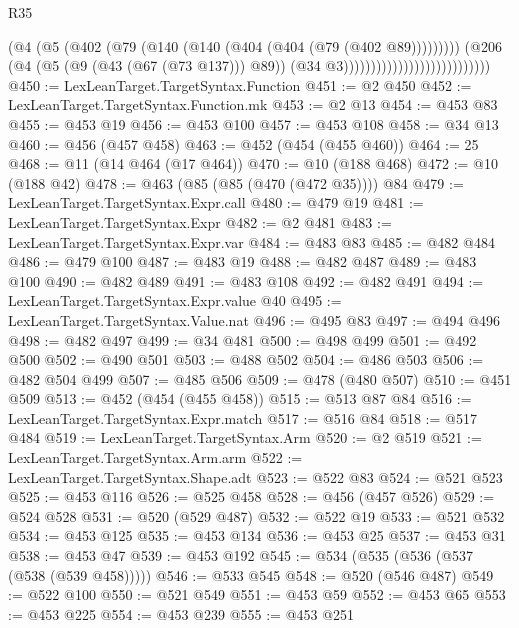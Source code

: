 \begin{lexlean}{R35}
\begin{coremodule}
                                                  (@4
                                                    (@5
                                                      (@402
                                                        (@79
                                                          (@140
                                                            (@140
                                                              (@404 (@404 (@79 (@402 @89)))))))))
                                                    (@206
                                                      (@4
                                                        (@5 (@9 (@43 (@67 (@73 @137))) @89))
                                                        (@34 @3)))))))))))))))))))))))))))
@450 := LexLeanTarget.TargetSyntax.Function
@451 := @2 @450
@452 := LexLeanTarget.TargetSyntax.Function.mk
@453 := @2 @13
@454 := @453 @83
@455 := @453 @19
@456 := @453 @100
@457 := @453 @108
@458 := @34 @13
@460 := @456 (@457 @458)
@463 := @452 (@454 (@455 @460))
@464 := 25
@468 := @11 (@14 @464 (@17 @464))
@470 := @10 (@188 @468)
@472 := @10 (@188 @42)
@478 := @463 (@85 (@85 (@470 (@472 @35)))) @84
@479 := LexLeanTarget.TargetSyntax.Expr.call
@480 := @479 @19
@481 := LexLeanTarget.TargetSyntax.Expr
@482 := @2 @481
@483 := LexLeanTarget.TargetSyntax.Expr.var
@484 := @483 @83
@485 := @482 @484
@486 := @479 @100
@487 := @483 @19
@488 := @482 @487
@489 := @483 @100
@490 := @482 @489
@491 := @483 @108
@492 := @482 @491
@494 := LexLeanTarget.TargetSyntax.Expr.value @40
@495 := LexLeanTarget.TargetSyntax.Value.nat
@496 := @495 @83
@497 := @494 @496
@498 := @482 @497
@499 := @34 @481
@500 := @498 @499
@501 := @492 @500
@502 := @490 @501
@503 := @488 @502
@504 := @486 @503
@506 := @482 @504 @499
@507 := @485 @506
@509 := @478 (@480 @507)
@510 := @451 @509
@513 := @452 (@454 (@455 @458))
@515 := @513 @87 @84
@516 := LexLeanTarget.TargetSyntax.Expr.match
@517 := @516 @84
@518 := @517 @484
@519 := LexLeanTarget.TargetSyntax.Arm
@520 := @2 @519
@521 := LexLeanTarget.TargetSyntax.Arm.arm
@522 := LexLeanTarget.TargetSyntax.Shape.adt
@523 := @522 @83
@524 := @521 @523
@525 := @453 @116
@526 := @525 @458
@528 := @456 (@457 @526)
@529 := @524 @528
@531 := @520 (@529 @487)
@532 := @522 @19
@533 := @521 @532
@534 := @453 @125
@535 := @453 @134
@536 := @453 @25
@537 := @453 @31
@538 := @453 @47
@539 := @453 @192
@545 := @534 (@535 (@536 (@537 (@538 (@539 @458)))))
@546 := @533 @545
@548 := @520 (@546 @487)
@549 := @522 @100
@550 := @521 @549
@551 := @453 @59
@552 := @453 @65
@553 := @453 @225
@554 := @453 @239
@555 := @453 @251

\end{coremodule}
\end{lexlean}
